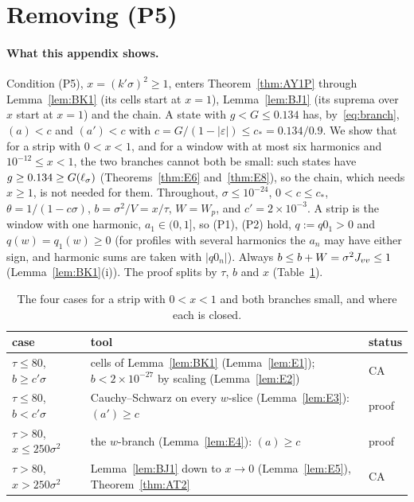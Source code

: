 \section{Removing (P5)}
\label{app:P5}

\paragraph*{What this appendix shows.}
Condition (P5), $x=(k'\sigma)^2\ge1$, enters Theorem~\ref{thm:AY1P} through Lemma~\ref{lem:BK1} (its cells start at $x=1$), Lemma~\ref{lem:BJ1} (its
suprema over $x$ start at $x=1$) and the chain. A state with $g<G\le0.134$ has, by~\eqref{eq:branch}, $(a)<c$ and $(a')<c$ with $c=G/(1-|\varepsilon|)\le c_*=0.134/0.9$.
We show that for a strip with $0<x<1$, and for a window with at most six harmonics and $10^{-12}\le x<1$, the two branches cannot both be small: such
states have $g\ge0.134\ge G(\ell_\sigma)$ (Theorems~\ref{thm:E6} and~\ref{thm:E8}), so the chain, which needs $x\ge1$, is not needed for them. Throughout,
$\sigma\le10^{-24}$, $0<c\le c_*$, $\theta=1/(1-c\sigma)$, $b=\sigma^2/V=x/\tau$, $W=W_p$, and $c'=2\times10^{-3}$. A strip is the window with one harmonic,
$a_1\in(0,1]$, so (P1), (P2) hold, $q:=q0_1>0$ and $q(w)=q_1(w)\ge0$ (for profiles with several harmonics the $a_n$ may have either sign, and harmonic
sums are taken with $|q0_n|$). Always $b\le b+W=\sigma^2J_{vv}\le1$ (Lemma~\ref{lem:BK1}(i)). The proof splits by $\tau$, $b$ and $x$ (Table~\ref{tab:P5cases}).

\begin{table}
\caption{The four cases for a strip with $0<x<1$ and both branches small, and where each is closed.}
\label{tab:P5cases}
\begin{ruledtabular}
\begin{tabular}{p{}p{}l}
case & tool & status\\ \hline
$\tau\le80$, $b\ge c'\sigma$ & cells of Lemma~\ref{lem:BK1} (Lemma~\ref{lem:E1}); $b<2\times10^{-27}$ by scaling (Lemma~\ref{lem:E2}) & CA\\
$\tau\le80$, $b<c'\sigma$ & Cauchy--Schwarz on every $w$-slice (Lemma~\ref{lem:E3}): $(a')\ge c$ & proof\\
$\tau>80$, $x\le250\sigma^2$ & the $w$-branch (Lemma~\ref{lem:E4}): $(a)\ge c$ & proof\\
$\tau>80$, $x>250\sigma^2$ & Lemma~\ref{lem:BJ1} down to $x\to0$ (Lemma~\ref{lem:E5}), Theorem~\ref{thm:AT2} & CA\\
\end{tabular}
\end{ruledtabular}
\end{table}

